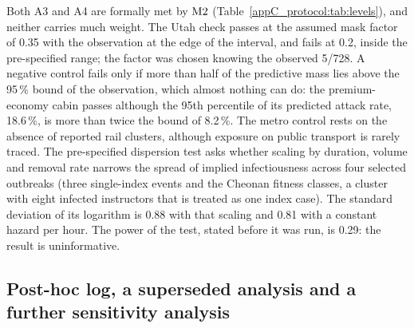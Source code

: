 Both A3 and A4 are formally met by $\mathrm{M2}$ (Table~\ref{appC_protocol:tab:levels}), and neither carries much
weight. The Utah check passes at the assumed mask factor of 0.35 with the observation at the edge of the
interval, and fails at 0.2, inside the pre-specified range; the factor was chosen knowing the observed 5/728.
A negative control fails only if more than half of the predictive mass lies above the 95\,\% bound of the
observation, which almost nothing can do: the premium-economy cabin passes although the 95th percentile of its
predicted attack rate, 18.6\,\%, is more than twice the bound of 8.2\,\%. The metro control rests on the
absence of reported rail clusters, although exposure on public transport is rarely traced.
The pre-specified dispersion test asks whether scaling by duration, volume and removal rate narrows the
spread of implied infectiousness across four selected outbreaks (three single-index events and the Cheonan
fitness classes, a cluster with eight infected instructors that is treated as one index case). The standard deviation of its
logarithm is 0.88 with that scaling and 0.81 with a constant hazard per hour. The power of the test, stated
before it was run, is 0.29: the result is uninformative.

\subsection{Post-hoc log, a superseded analysis and a further sensitivity analysis}\label{appC_protocol:sec:posthoc}


